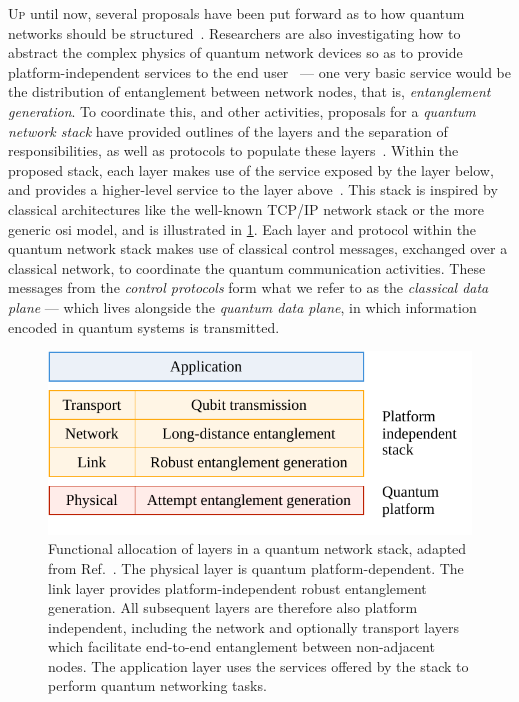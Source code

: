 \lettrine{U}{p} until now, several proposals have been put forward as to how quantum networks should
be structured~\cite{van_meter_2013_repeaters, schoute_2016_shortcuts, joshi_2020_trusted}.
Researchers are also investigating how to abstract the complex physics of quantum network devices so
as to provide platform-independent services to the end user~\cite{dahlberg_2019_egp,
pirker_2019_quantum, illiano_2022_quantum} --- one very basic service would be the distribution of
entanglement between network nodes, that is, \emph{entanglement generation}. To coordinate this, and
other activities, proposals for a \emph{quantum network stack} have provided outlines of the layers
and the separation of responsibilities, as well as protocols to populate these
layers~\cite{dahlberg_2019_egp, kozlowski_2020_qnp}. Within the proposed stack, each layer makes use
of the service exposed by the layer below, and provides a higher-level service to the layer
above~\cite{dahlberg_2019_egp}. This stack is inspired by classical architectures like the
well-known TCP/IP network stack or the more generic \acrfull{osi} model, and is illustrated in
\cref{fig:functional-allocation}. Each layer and protocol within the quantum network stack makes use
of classical control messages, exchanged over a classical network, to coordinate the quantum
communication activities. These messages from the \emph{control protocols} form what we refer to as
the \emph{classical data plane} --- which lives alongside the \emph{quantum data plane}, in which
information encoded in quantum systems is transmitted.

\begin{figure}[b]
    \centering
    \includegraphics[width=0.6\linewidth]{figures/functional-allocation.pdf}
    \caption{
        Functional allocation of layers in a quantum network stack, adapted from
        Ref.~\cite{dahlberg_2019_egp}. The physical layer is quantum platform-dependent. The link
        layer provides platform-independent robust entanglement generation. All subsequent layers
        are therefore also platform independent, including the network and optionally transport
        layers which facilitate end-to-end entanglement between non-adjacent nodes. The application
        layer uses the services offered by the stack to perform quantum networking tasks.
    }
    \label{fig:functional-allocation}
\end{figure}

